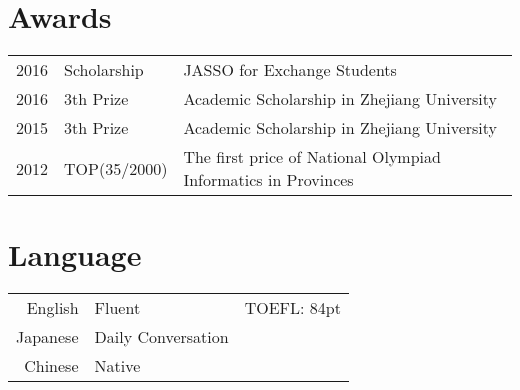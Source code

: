 \documentclass[]{deedy-resume-openfont}
\begin{document}
\begin{minipage}[t]{0.73\textwidth}
\section{Awards} 
\begin{tabular}{rll}
2016      & Scholarship & JASSO for Exchange Students \\
2016	     & 3th Prize  & Academic Scholarship in Zhejiang University \\
2015	     & 3th Prize  & Academic Scholarship in Zhejiang University \\
2012	     & TOP(35/2000)  & The first price of National Olympiad Informatics in Provinces \\
\end{tabular}
\sectionsep



\section{Language} 
\begin{tabular}{rll}
English   & Fluent & TOEFL: 84pt \\
Japanese	     & Daily Conversation  &  \\
Chinese	     & Native  &  \\
\end{tabular}
\sectionsep



% 
% 

\end{minipage} 
\end{document}
